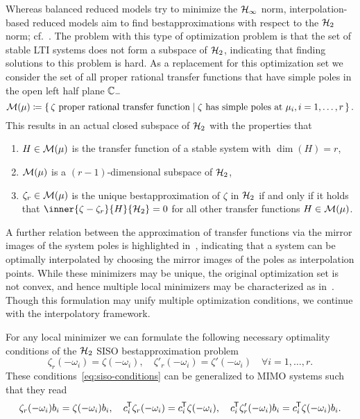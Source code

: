Whereas balanced reduced models try to minimize the $\mathcal{H}_\infty$ norm, interpolation-based reduced models aim to find bestapproximations with respect to the $\mathcal{H}_2$ norm; cf.~\cite[Section~3]{Gugercin2008}.
The problem with this type of optimization problem is that the set of stable LTI systems does not form a subspace of $\mathcal{H}_2$, indicating that finding solutions to this problem is hard.
As a replacement for this optimization set we consider the set of all proper rational transfer functions that have simple poles in the open left half plane $\mathbb{C}_{-}$
\begin{equation*}
    \mathcal{M}(\mu) \coloneqq \left\{\,\zeta \text{ proper rational transfer function}\mid\zeta \text{ has simple poles at } \mu_i, i = 1, \dots, r\,\right\}.
\end{equation*}
This results in an actual closed subspace of $\mathcal{H}_2$ with the properties that
\begin{enumerate}
    \item $H \in \mathcal{M}(\mu)$ is the transfer function of a stable system with $\dim{(H)} = r$,
    \item $\mathcal{M}(\mu)$ is a $(r - 1)$-dimensional subspace of $\mathcal{H}_2$,
    \item $\zeta_r \in \mathcal{M}(\mu)$ is the unique bestapproximation of $\zeta$ in $\mathcal{H}_2$ if and only if it holds that $\inner{\zeta - \zeta_r}{H}{\mcl{H}_2} = 0$ for all other transfer functions $H \in \mathcal{M}(\mu)$.
\end{enumerate}
A further relation between the approximation of transfer functions via the mirror images of the system poles is highlighted in~\cite[Section~3.1]{Gugercin2008}, indicating that a system can be optimally interpolated by choosing the mirror images of the poles as interpolation points.
While these minimizers may be unique, the original optimization set is not convex, and hence multiple local minimizers may be characterized as in~\cite[Theorem~3.2]{Gugercin2008}.
Though this formulation may unify multiple optimization conditions, we continue with the interpolatory framework.


For any local minimizer we can formulate the following necessary optimality conditions of the $\mathcal{H}_2$ SISO bestapproximation problem
\begin{equation}\label{eq:siso-conditions}
    \zeta_r(- \omega_i) = \zeta(- \omega_i),\quad \zeta'_r(- \omega_i) = \zeta'(- \omega_i) \quad \forall i = 1, \dots, r.
\end{equation}
These conditions~\eqref{eq:siso-conditions} can be generalized to MIMO systems such that they read
\begin{equation}\label{eq:mimo-conditions}
    \zeta_r(- \omega_i) b_i = \zeta(- \omega_i) b_i,\quad c_i^{\mkern-1.5mu \mathsf{T}} \zeta_r(- \omega_i) = c_i^{\mkern-1.5mu \mathsf{T}} \zeta(- \omega_i),\quad c_i^{\mkern-1.5mu \mathsf{T}} \zeta'_r(- \omega_i) b_i = c_i^{\mkern-1.5mu \mathsf{T}} \zeta(- \omega_i) b_i.
\end{equation}

